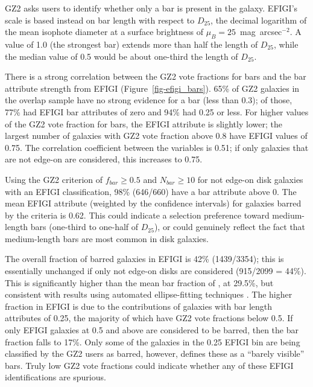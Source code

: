 \documentclass[useAMS,usenatbib]{mn2e}
\begin{document}
GZ2 asks users to identify whether only a bar is present in the galaxy. EFIGI's scale is based instead on bar length with respect to $D_{25}$, the decimal logarithm of the mean isophote diameter at a surface brightness of $\mu_B=25$~mag~arcsec$^{-2}$. A value of 1.0 (the strongest bar) extends more than half the length of $D_{25}$, while the median value of 0.5 would be about one-third the length of $D_{25}$. 

There is a strong correlation between the GZ2 vote fractions for bars and the bar attribute strength from EFIGI (Figure~\ref{fig-efigi_bars}). 65\% of GZ2 galaxies in the overlap sample have no strong evidence for a bar (less than 0.3); of those, 77\% had EFIGI bar attributes of zero and 94\% had 0.25 or less. For higher values of the GZ2 vote fraction for bars, the EFIGI attribute is slightly lower; the largest number of galaxies with GZ2 vote fraction above 0.8 have EFIGI values of 0.75. The correlation coefficient between the variables is 0.51; if only galaxies that are not edge-on are considered, this increases to 0.75. 

Using the \citet{mas11c} GZ2 criterion of $f_{bar}\geq0.5$ and $N_{bar}\geq10$ for not edge-on disk galaxies with an EFIGI classification, 98\% (646/660) have a bar attribute above 0. The mean EFIGI attribute (weighted by the confidence intervals) for galaxies barred by the \citet{mas11c} criteria is 0.62. This could indicate a selection preference toward medium-length bars (one-third to one-half of $D_{25}$), or could genuinely reflect the fact that medium-length bars are most common in disk galaxies. 

The overall fraction of barred galaxies in EFIGI is 42\% (1439/3354); this is essentially unchanged if only not edge-on disks are considered (915/2099 = 44\%). This is significantly higher than the mean bar fraction of \citet{mas11c}, at 29.5\%, but consistent with results using automated ellipse-fitting techniques \citep{bar08,agu09}. The higher fraction in EFIGI is due to the contributions of galaxies with bar length attributes of 0.25, the majority of which have GZ2 vote fractions below 0.5. If only EFIGI galaxies at 0.5 and above are considered to be barred, then the bar fraction falls to 17\%. Only some of the galaxies in the 0.25 EFIGI bin are being classified by the GZ2 users as barred, however, \citet{bai11} defines these as a ``barely visible'' bars. Truly low GZ2 vote fractions could indicate whether any of these EFIGI identifications are spurious.

\end{document}
